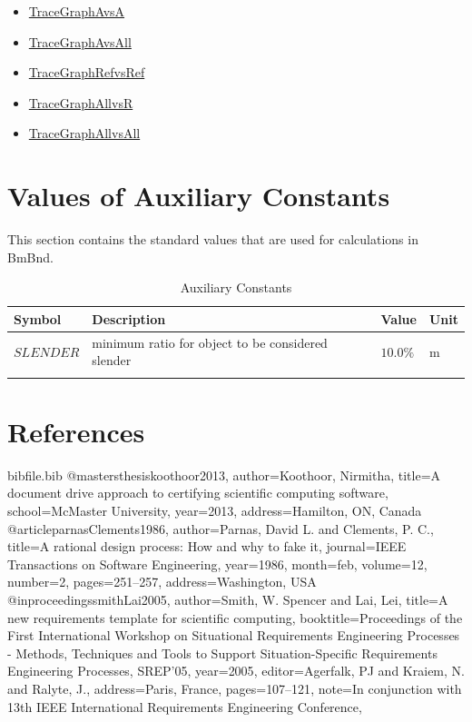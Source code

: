 \documentclass[12pt]{article}
\begin{document}
\begin{itemize}
\item{\hyperref{../../../../traceygraphs/bmbnd/avsa.svg}{}{}{TraceGraphAvsA}}
\item{\hyperref{../../../../traceygraphs/bmbnd/avsall.svg}{}{}{TraceGraphAvsAll}}
\item{\hyperref{../../../../traceygraphs/bmbnd/refvsref.svg}{}{}{TraceGraphRefvsRef}}
\item{\hyperref{../../../../traceygraphs/bmbnd/allvsr.svg}{}{}{TraceGraphAllvsR}}
\item{\hyperref{../../../../traceygraphs/bmbnd/allvsall.svg}{}{}{TraceGraphAllvsAll}}
\end{itemize}
\section{Values of Auxiliary Constants}
\label{Sec:AuxConstants}
This section contains the standard values that are used for calculations in BmBnd.

\begin{longtable}{l l l l}
\toprule
\textbf{Symbol} & \textbf{Description} & \textbf{Value} & \textbf{Unit}
\\
\midrule
\endhead
$\mathit{SLENDER}$ & minimum ratio for object to be considered slender & $10.0\%$ & ${\text{m}}$
\\
\bottomrule
\caption{Auxiliary Constants}
\label{Table:TAuxConsts}
\end{longtable}
\section{References}
\label{Sec:References}
\begin{filecontents*}{bibfile.bib}
@mastersthesis{koothoor2013,
author={Koothoor, Nirmitha},
title={A document drive approach to certifying scientific computing software},
school={McMaster University},
year={2013},
address={Hamilton, ON, Canada}}
@article{parnasClements1986,
author={Parnas, David L. and Clements, P. C.},
title={A rational design process: How and why to fake it},
journal={IEEE Transactions on Software Engineering},
year={1986},
month=feb,
volume={12},
number={2},
pages={251--257},
address={Washington, USA}}
@inproceedings{smithLai2005,
author={Smith, W. Spencer and Lai, Lei},
title={A new requirements template for scientific computing},
booktitle={Proceedings of the First International Workshop on Situational Requirements Engineering Processes - Methods, Techniques and Tools to Support Situation-Specific Requirements Engineering Processes, SREP'05},
year={2005},
editor={Agerfalk, PJ and Kraiem, N. and Ralyte, J.},
address={Paris, France},
pages={107--121},
note={In conjunction with 13th IEEE International Requirements Engineering Conference,}}
\end{filecontents*}
\nocite{*}
\printbibliography[heading=none]
\end{document}
